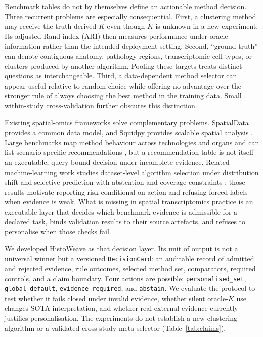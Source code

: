 \documentclass[12pt]{article}
\newcommand{\software}{HistoWeave}
\begin{document}
Benchmark tables do not by themselves define an actionable method decision.
Three recurrent problems are especially consequential. First, a clustering
method may receive the truth-derived \(K\) even though \(K\) is unknown in a
new experiment. Its adjusted Rand index (ARI) then measures performance under
oracle information rather than the intended deployment setting. Second,
``ground truth'' can denote contiguous anatomy, pathology regions,
transcriptomic cell types, or clusters produced by another algorithm. Pooling
these targets treats distinct questions as interchangeable. Third, a
data-dependent method selector can appear useful relative to random choice
while offering no advantage over the stronger rule of always choosing the
best method in the training data. Small within-study cross-validation further
obscures this distinction.

Existing spatial-omics frameworks solve complementary problems. SpatialData
provides a common data model, and Squidpy provides scalable spatial analysis
\citep{marconato2025,palla2022}. Large benchmarks map method behaviour across
technologies and organs and can list scenario-specific recommendations
\citep{yuan2024,chen2025imeta}, but a recommendation table is not itself an
executable, query-bound decision under incomplete evidence. Related
machine-learning work studies dataset-level algorithm selection under
distribution shift \citep{jiang2025ood} and selective prediction with
abstention and coverage constraints
\citep{geifman2017selective,casacuberta2025selective}; those results motivate
reporting risk conditional on action and refusing forced labels when evidence
is weak. What is missing in spatial transcriptomics practice is an executable
layer that decides which benchmark evidence is admissible for a declared task,
binds validation results to their source artefacts, and refuses to personalise
when those checks fail.

We developed \software{} as that decision layer. Its unit of output is not a
universal winner but a versioned \texttt{DecisionCard}: an auditable record of
admitted and rejected evidence, rule outcomes, selected method set,
comparators, required controls, and a claim boundary. Four actions are
possible: \texttt{personalised\_set}, \texttt{global\_default},
\texttt{evidence\_required}, and \texttt{abstain}. We evaluate the protocol
to test whether it fails closed under invalid evidence, whether silent
oracle-\(K\) use changes SOTA interpretation, and whether real external
evidence currently justifies personalisation. The experiments do not establish
a new clustering algorithm or a validated cross-study meta-selector
(Table~\ref{tab:claims}).
\end{document}
